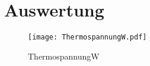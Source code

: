 \section{Auswertung}
\label{sec:Auswertung}

\begin{figure}
  \centering
  \texttt{[image: ThermospannungW.pdf]}
  \caption{ThermospannungW}
\end{figure}
